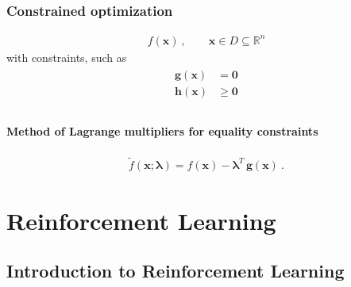 \documentclass[letterpaper,10pt,english]{jupyterBook}
\begin{document}
\section{Constrained optimization}
\label{\detokenize{ch/optimization/intro:constrained-optimization}}\label{\detokenize{ch/optimization/intro:id2}}\begin{equation*}
\begin{split}f(\mathbf{x}) \ , \qquad \mathbf{x} \in D \subseteq \mathbb{R}^n \end{split}
\end{equation*}
\sphinxAtStartPar
with constraints, such as
\begin{equation*}
\begin{split}\begin{aligned}
  \mathbf{g}(\mathbf{x}) & = \mathbf{0} \\
  \mathbf{h}(\mathbf{x}) & \ge \mathbf{0} \\
\end{aligned}\end{split}
\end{equation*}

\subsection{Method of Lagrange multipliers for equality constraints}
\label{\detokenize{ch/optimization/intro:method-of-lagrange-multipliers-for-equality-constraints}}\label{\detokenize{ch/optimization/intro:optimization-constrained-lagrange-multipliers}}\begin{equation*}
\begin{split}\widetilde{f}(\mathbf{x}; \boldsymbol{\lambda}) = f(\mathbf{x}) - \boldsymbol{\lambda}^T \, \mathbf{g}(\mathbf{x}) \ .\end{split}
\end{equation*}
\sphinxstepscope


\part{Reinforcement Learning}

\sphinxstepscope


\chapter{Introduction to Reinforcement Learning}
\label{\detokenize{ch/rl/intro:introduction-to-reinforcement-learning}}\label{\detokenize{ch/rl/intro:rl-intro}}\label{\detokenize{ch/rl/intro::doc}}
\sphinxstepscope
\end{document}
